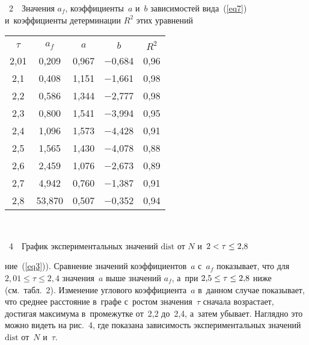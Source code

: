 \begin{multicols}{2}
\begin{center}
\vspace*{6pt}

\noindent
\parbox{62mm}{{{\tablename~2}\ \ \small{Значения $a_f$, коэффициенты~$a$ и~$b$ зависимостей вида~(\ref{eq7})
и~коэффициенты детерминации $R^2$ этих уравнений
}}
}

\vspace*{6pt}


{\small \begin{tabular}{|c|c|c|c|c|}
\hline
&&&&\\[-10pt]
$\tau$ & $a_f$ & $a$ & $b$ & $R^2$ \\
 \hline
\hphantom{9}2,01 & 0,209 & 0,967 & $-$0,684 & 0,96 \\
2,1 &   0,408 & 1,151 & $-$1,661 & 0,98 \\
2,2 &   0,586 & 1,344 & $-$2,777 & 0,98 \\
2,3 &   0,800 & 1,541 & $-$3,994 & 0,95 \\
2,4 &   1,096 & 1,573 & $-$4,428 & 0,91 \\
2,5 &   1,565 & 1,430 & $-$4,078 & 0,88 \\
2,6 &   2,459 & 1,076 & $-$2,673 & 0,89 \\
2,7 &   4,942 & 0,760 & $-$1,387 & 0,91 \\
2,8 &   53,870\hphantom{9} & 0,507 & $-$0,352 & 0,94\\
\hline
\end{tabular}
}
\vspace*{3pt}
\end{center}


{ \begin{center}  %
 \vspace*{-2pt}
   \mbox{%
\epsfxsize=78.504mm
}

\end{center}

\noindent
{{\figurename~4}\ \ \small{График экспериментальных
значений $\mathrm{dist}$ от $N$ и~$2\hm<\tau\hm\leq 2{,}8$
}}}

\vspace*{6pt}

\addtocounter{figure}{1}
\addtocounter{table}{1}


\noindent
 ние~(\ref{eq3})).
Сравнение значений коэффициентов~$a$ с~$a_f$ показывает, что для $2{,}01\leq\tau\leq 2{,}4$ значения~$a$ 
выше значений $a_f$, а~при $2{,}5\hm\leq\tau\hm\leq 2{,}8$ ниже (см.\ табл.~2).
Изменение углового коэффициента~$a$ в~данном случае показывает, что сред\-нее расстояние в~графе
с~рос\-том значения~$\tau$ сначала возрастает, достигая максимума в~промежутке от~2,2 до~2,4, 
а~затем убывает. На\-гляд\-но это мож\-но видеть на рис.~4, где показана за\-ви\-си\-мость
экспериментальных значений $\mathrm{dist}$ от~$N$ и~$\tau$.






\end{multicols}
